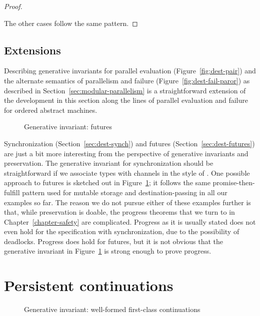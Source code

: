 \begin{proof}
\begin{description}
\medskip

\end{description}

\noindent
The other cases follow the same pattern.
\end{proof}

\subsection{Extensions}

Describing generative invariants for parallel evaluation
(Figure~\ref{fig:dest-pair}) and the alternate semantics of
parallelism and failure (Figure~\ref{fig:dest-fail-paror}) as
described in Section~\ref{sec:modular-parallelism} is a
straightforward extension of the development in this section along the
lines of parallel evaluation and failure for ordered abstract
machines.

\begin{figure}[tp]
\caption{Generative invariant: futures}
\label{fig:gen-future} 
\end{figure}

Synchronization (Section~\ref{sec:dest-synch}) and futures
(Section~\ref{sec:dest-futures}) are just a bit more interesting from
the perspective of generative invariants and preservation. The
generative invariant for synchronization should be straightforward if
we associate types with channels in the style of \cite[Section
41.5]{harper12practical}. One possible approach to futures is sketched
out in Figure~\ref{fig:gen-future}; it follows the same
promise-then-fulfill pattern used for mutable storage and
destination-passing in all our examples so far. The reason we do not
pursue either of these examples further is that, while preservation is
doable, the progress theorems that we turn to in
Chapter~\ref{chapter-safety} are complicated. Progress as it is
usually stated does not even hold for the specification with
synchronization, due to the possibility of deadlocks. Progress does
hold for futures, but it is not obvious that the generative invariant
in Figure~\ref{fig:gen-future} is strong enough to prove progress.


\section{Persistent continuations}
\label{sec:gen-letcc}


\begin{figure}[tp]
\caption{Generative invariant: well-formed first-class continuations}
\label{fig:gen-letcc} 
\end{figure}

